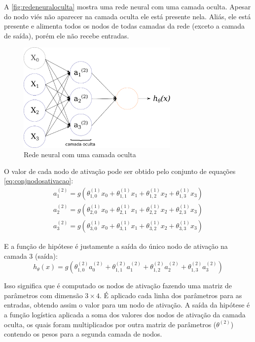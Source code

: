 A \autoref{fig:redeneuraloculta} mostra uma rede neural com uma camada oculta. Apesar do nodo viés não aparecer na camada oculta ele está presente nela. Aliás, ele está presente e alimenta todos os nodos de todas camadas da rede (exceto a camada de saída), porém ele não recebe entradas.

\begin{figure}
\centering
\caption{Rede neural com uma camada oculta} \label{fig:redeneuraloculta}
\includegraphics[width=0.7\textwidth]{img/redeneuraloculta.pdf}
\end{figure}

O valor de cada nodo de ativação pode ser obtido pelo conjunto de equações \ref{eq:conjnodosativacao}:
\begin{align}
a_1^{(2)} = g(\theta_{1,0}^{(1)}x_0 + \theta_{1,1}^{(1)}x_1 + \theta_{1,2}^{(1)}x_2 + \theta_{1,3}^{(1)}x_3) \nonumber \\
a_2^{(2)} = g(\theta_{2,0}^{(1)}x_0 + \theta_{2,1}^{(1)}x_1 + \theta_{2,2}^{(1)}x_2 + \theta_{2,3}^{(1)}x_3) \nonumber \\
a_3^{(2)} = g(\theta_{3,0}^{(1)}x_0 + \theta_{3,1}^{(1)}x_1 + \theta_{3,2}^{(1)}x_2 + \theta_{3,3}^{(1)}x_3) \label{eq:conjnodosativacao}
\end{align}

E a função de hipótese é justamente a saída do único nodo de ativação na camada 3 (saída):
\begin{equation}
h_{\theta}(x) = g(\theta_{1,0}^{(2)}a_0^{(2)} + \theta_{1,1}^{(2)}a_1^{(2)} + \theta_{1,2}^{(2)}a_2^{(2)} + \theta_{1,3}^{(2)}a_3^{(2)}) \nonumber
\end{equation}

Isso significa que é computado os nodos de ativação fazendo uma matriz de parâmetros com dimensão $3 \times 4$. É aplicado cada linha dos parâmetros para as entradas, obtendo assim o valor para um nodo de ativação. A saída da hipótese é a função logística aplicada a soma dos valores dos nodos de ativação da camada oculta, os quais foram multiplicados por outra matriz de parâmetros ($\theta^{(2)}$) contendo os pesos para a segunda camada de nodos.

